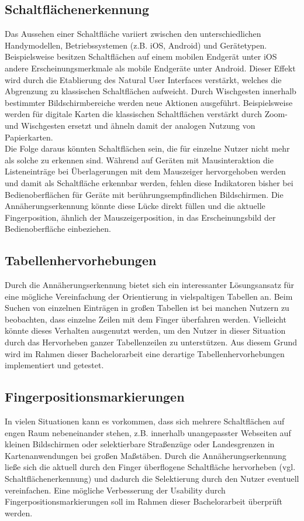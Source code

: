 \documentclass[a4paper,12pt,bibliography=totoc]{scrreprt}%
\begin{document}
\subsection{Schaltflächenerkennung}
Das Aussehen einer Schaltfläche variiert zwischen den unterschiedlichen Handymodellen, Betriebssystemen (z.B. iOS, Android) und Gerätetypen. Beispielsweise besitzen Schaltflächen auf einem mobilen Endgerät unter iOS andere Erscheinungsmerkmale als mobile Endgeräte unter Android. Dieser Effekt wird durch die Etablierung des Natural User Interfaces \cite{nui} verstärkt, welches die Abgrenzung zu klassischen Schaltflächen aufweicht. Durch Wischgesten innerhalb bestimmter Bildschirmbereiche werden neue Aktionen ausgeführt. Beispielsweise werden für digitale Karten die klassischen Schaltflächen verstärkt durch Zoom- und Wischgesten ersetzt und ähneln damit der analogen Nutzung von Papierkarten.\\
Die Folge daraus könnten Schaltflächen sein, die für einzelne Nutzer nicht mehr als solche zu erkennen sind. Während auf Geräten mit Mausinteraktion die Listeneinträge bei Überlagerungen mit dem Mauszeiger hervorgehoben werden und damit als Schaltfläche erkennbar werden, fehlen diese Indikatoren bisher bei Bedienoberflächen für Geräte mit berührungsempfindlichen Bildschirmen. Die Annäherungserkennung könnte diese Lücke direkt füllen und die aktuelle Fingerposition, ähnlich der Mauszeigerposition, in das Erscheinungsbild der Bedienoberfläche einbeziehen.

\subsection{Tabellenhervorhebungen}
Durch die Annäherungserkennung bietet sich ein interessanter Lösungsansatz für eine mögliche Vereinfachung der Orientierung in vielspaltigen Tabellen an. Beim Suchen von einzelnen Einträgen in großen Tabellen ist bei manchen Nutzern zu beobachten, dass einzelne Zeilen mit dem Finger überfahren werden. Vielleicht könnte dieses Verhalten ausgenutzt werden, um den Nutzer in dieser Situation durch das Hervorheben ganzer Tabellenzeilen zu unterstützen. Aus diesem Grund wird im Rahmen dieser Bachelorarbeit eine derartige Tabellenhervorhebungen implementiert und getestet.

\subsection{Fingerpositionsmarkierungen}
In vielen Situationen kann es vorkommen, dass sich mehrere Schaltflächen auf engen Raum nebeneinander stehen, z.B. innerhalb unangepasster Webseiten auf kleinen Bildschirmen oder selektierbare Straßenzüge oder Landesgrenzen in Kartenanwendungen bei großen Maßstäben. Durch die Annäherungserkennung ließe sich die aktuell durch den Finger überflogene Schaltfläche hervorheben (vgl. Schaltflächenerkennung) und dadurch die Selektierung durch den Nutzer eventuell vereinfachen. Eine mögliche Verbesserung der Usability durch Fingerpositionsmarkierungen soll im Rahmen dieser Bachelorarbeit überprüft werden.
\end{document}
